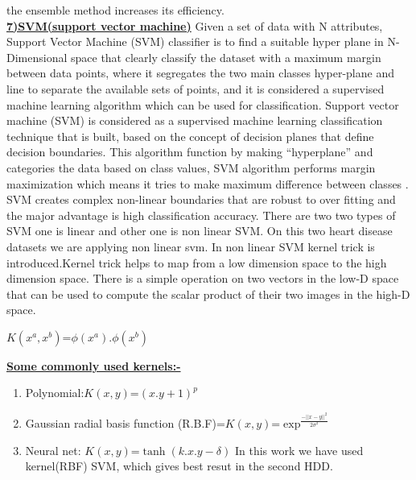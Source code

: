 \documentclass[11pt]{article}
\begin{document}
the ensemble method increases its efficiency.\\
\underline{\textbf{7)SVM(support vector machine)}} Given a set of data with N attributes, Support Vector Machine (SVM) classifier is to
find a suitable hyper plane in N-Dimensional space that clearly classify the dataset with
a maximum margin between data points, where it segregates the two main classes hyper-plane and line to separate the available sets of points, and it is considered a supervised machine learning algorithm which can be used for classification. Support vector machine (SVM) is considered as a supervised machine learning classification 
technique that is built, based on the concept of decision planes that define decision boundaries. This 
algorithm function by making “hyperplane” and categories the data based on class values, SVM 
algorithm performs margin maximization which means it tries to make maximum difference between 
classes . SVM creates complex non-linear boundaries that are robust to over fitting and 
the major advantage is high classification accuracy. There are two two types of SVM one is linear and other one is non linear SVM. On this two heart disease datasets we are applying non linear svm. In non linear SVM kernel trick is introduced.Kernel trick helps to map from a low dimension space to the high dimension space. There is a simple operation on two vectors in the low-D space that can be used to compute the scalar product of their two images in the high-D space.
\begin{center}
$K(x^{a},x^{b})$=$\phi(x^{a})$.$\phi(x^{b})$
\end{center}
\underline{\textbf{Some commonly used kernels:-}}
\begin{enumerate}
\vspace{-0.3cm}
\item Polynomial:$K(x,y)$=$(x.y+1)^{p}$ 
\vspace{-0.4cm}
\item Gaussian radial basis function (R.B.F)=$K(x,y)$=$\displaystyle\exp^{\displaystyle\frac{-||x-y||^{2}}{2\sigma^{2}}}$
\vspace{-0.3cm}
\item Neural net: $K(x,y)$=$\tanh(k.x.y-\delta)$
In this work we have used kernel(RBF) SVM, which gives best resut in the second HDD.
\end{enumerate}
\end{document}
